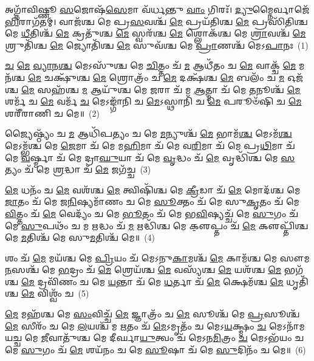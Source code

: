 \setcounter{anuvakam}{0}
𑌅𑌗𑍍𑌨𑌾᳴𑌵𑌿𑌷𑍍𑌣𑍂 \ul{𑌸}\-𑌜𑍋𑌷᳴\-\ul{𑌸𑍇}\-𑌮𑌾 𑌵᳴𑌰𑍍𑌧𑌨𑍍𑌤𑍁 \ul{𑌵𑌾𑌂} 𑌗𑌿𑌰𑌃᳴। \ul{𑌦𑍍𑌯𑍁}\-𑌮𑍍𑌨𑍈𑌰𑍍𑌵𑌾𑌜𑍇᳴\-\ul{𑌭𑌿}\-𑌰𑌾𑌗᳴𑌤𑌮𑍍। 𑌵𑌾𑌜᳴𑌶𑍍𑌚 𑌮𑍇 𑌪𑍍𑌰\-\ul{𑌸}\-𑌵𑌶𑍍𑌚᳴ \ul{𑌮𑍇} 𑌪𑍍𑌰𑌯᳴𑌤𑌿𑌶𑍍𑌚 \ul{𑌮𑍇} 𑌪𑍍𑌰𑌸𑌿᳴𑌤𑌿𑌶𑍍𑌚 𑌮𑍇 \ul{𑌧𑍀}\-𑌤𑌿𑌶𑍍𑌚᳴ \ul{𑌮𑍇} 𑌕𑍍𑌰𑌤𑍁᳴𑌶𑍍𑌚 \ul{𑌮𑍇} 𑌸𑍍𑌵𑌰᳴𑌶𑍍𑌚 \ul{𑌮𑍇} 𑌶𑍍𑌲𑍋𑌕᳴𑌶𑍍𑌚 𑌮𑍇 \ul{𑌶𑍍𑌰𑌾}\-𑌵𑌶𑍍𑌚᳴ \ul{𑌮𑍇} 𑌶𑍍𑌰𑍁𑌤𑌿᳴𑌶𑍍𑌚 \ul{𑌮𑍇} 𑌜𑍍𑌯𑍋𑌤𑌿᳴𑌶𑍍𑌚 \ul{𑌮𑍇} 𑌸𑍁𑌵᳴𑌶𑍍𑌚 𑌮𑍇 \ul{𑌪𑍍𑌰𑌾}\-𑌣𑌶𑍍𑌚᳴ 𑌮𑍇\-𑌽\-\ul{𑌪𑌾}\-𑌨𑌃~(1)

\-\ul{𑌚} \ul{𑌮𑍇} \ul{𑌵𑍍𑌯𑌾}\-𑌨\-\ul{𑌶𑍍𑌚} 𑌮𑍇\-𑌽𑌸𑍁᳴𑌶𑍍𑌚 𑌮𑍇 \ul{𑌚𑌿}\-𑌤𑍍𑌤𑌂 𑌚᳴ \ul{𑌮} 𑌆𑌧𑍀᳴𑌤𑌂 𑌚 \ul{𑌮𑍇} 𑌵𑌾𑌕𑍍𑌚᳴ \ul{𑌮𑍇} 𑌮𑌨᳴𑌶𑍍𑌚 \ul{𑌮𑍇} 𑌚𑌕𑍍𑌷𑍁᳴𑌶𑍍𑌚 \ul{𑌮𑍇} 𑌶𑍍𑌰𑍋𑌤𑍍𑌰𑌂᳴ 𑌚 \ul{𑌮𑍇} 𑌦𑌕𑍍𑌷᳴𑌶𑍍𑌚 \ul{𑌮𑍇} 𑌬𑌲𑌂᳴ 𑌚 \ul{𑌮} 𑌓𑌜᳴𑌶𑍍𑌚 \ul{𑌮𑍇} 𑌸𑌹᳴𑌶𑍍𑌚 \ul{𑌮} 𑌆𑌯𑍁᳴𑌶𑍍𑌚 𑌮𑍇 \ul{𑌜}\-𑌰𑌾 𑌚᳴ 𑌮 \ul{𑌆}\-𑌤𑍍𑌮𑌾 𑌚᳴ 𑌮𑍇 \ul{𑌤}\-𑌨𑍂𑌶𑍍𑌚᳴ \ul{𑌮𑍇} 𑌶𑌰𑍍𑌮᳴ 𑌚 \ul{𑌮𑍇} 𑌵𑌰𑍍𑌮᳴ \ul{𑌚} 𑌮𑍇\-𑌽𑌙𑍍𑌗𑌾᳴𑌨𑌿 𑌚 \ul{𑌮𑍇}\-\-𑌽𑌸𑍍𑌥𑌾𑌨𑌿᳴ 𑌚 \ul{𑌮𑍇} 𑌪𑌰𑍂𑍞᳴𑌷𑌿 𑌚 \ul{𑌮𑍇} 𑌶𑌰𑍀᳴𑌰𑌾𑌣𑌿 𑌚 𑌮𑍇॥~(2)

{\anuvakamend[{\-\ul{𑌅}\-\-\ul{𑌪𑌾}\-𑌨\-\ul{𑌸𑍍𑌤}\-𑌨𑍂𑌶𑍍𑌚᳴ \ul{𑌮𑍇}\-\-𑌽𑌷𑍍𑌟𑌾𑌦᳴𑌶 𑌚}]}%

𑌜𑍍𑌯𑍈𑌷𑍍𑌠𑍍𑌯𑌂᳴ 𑌚 \ul{𑌮} 𑌆𑌧𑌿᳴𑌪𑌤𑍍𑌯𑌂 𑌚 𑌮𑍇 \ul{𑌮}\-𑌨𑍍𑌯𑍁𑌶𑍍𑌚᳴ \ul{𑌮𑍇} 𑌭𑌾𑌮᳴\-\ul{𑌶𑍍𑌚} 𑌮𑍇\-𑌽𑌮᳴\-\ul{𑌶𑍍𑌚} 𑌮𑍇\-𑌽𑌮𑍍𑌭᳴𑌶𑍍𑌚 𑌮𑍇 \ul{𑌜𑍇}\-𑌮𑌾 𑌚᳴ 𑌮𑍇 𑌮\-\ul{𑌹𑌿}\-𑌮𑌾 𑌚᳴ 𑌮𑍇 𑌵\-\ul{𑌰𑌿}\-𑌮𑌾 𑌚᳴ 𑌮𑍇 𑌪𑍍𑌰\-\ul{𑌥𑌿}\-𑌮𑌾 𑌚᳴ 𑌮𑍇 \ul{𑌵}\-𑌰𑍍𑌷𑍍𑌮𑌾 𑌚᳴ 𑌮𑍇 𑌦𑍍𑌰𑌾\-\ul{𑌘𑍁}\-𑌯𑌾 𑌚᳴ 𑌮𑍇 \ul{𑌵𑍃}\-𑌦𑍍𑌧𑌂 𑌚᳴ \ul{𑌮𑍇} 𑌵𑍃𑌦𑍍𑌧𑌿᳴𑌶𑍍𑌚 𑌮𑍇 \ul{𑌸}\-𑌤𑍍𑌯𑌂 𑌚᳴ 𑌮𑍇 \ul{𑌶𑍍𑌰}\-𑌦𑍍𑌧𑌾 𑌚᳴ \ul{𑌮𑍇} 𑌜𑌗᳴𑌚𑍍𑌚~(3)

\-\ul{𑌮𑍇} 𑌧𑌨𑌂᳴ 𑌚 \ul{𑌮𑍇} 𑌵𑌶᳴𑌶𑍍𑌚 \ul{𑌮𑍇} 𑌤𑍍𑌵𑌿𑌷𑌿᳴𑌶𑍍𑌚 𑌮𑍇 \ul{𑌕𑍍𑌰𑍀}\-𑌡𑌾 𑌚᳴ \ul{𑌮𑍇} 𑌮𑍋𑌦᳴𑌶𑍍𑌚 𑌮𑍇 \ul{𑌜𑌾}\-𑌤𑌂 𑌚᳴ 𑌮𑍇 𑌜\-\ul{𑌨𑌿}\-𑌷𑍍𑌯𑌮𑌾᳴𑌣𑌂 𑌚 𑌮𑍇 \ul{𑌸𑍂}\-𑌕𑍍𑌤𑌂 𑌚᳴ 𑌮𑍇 𑌸𑍁\-\ul{𑌕𑍃}\-𑌤𑌂 𑌚᳴ 𑌮𑍇 \ul{𑌵𑌿}\-𑌤𑍍𑌤𑌂 𑌚᳴ \ul{𑌮𑍇} 𑌵𑍇𑌦𑍍𑌯𑌂᳴ 𑌚 𑌮𑍇 \ul{𑌭𑍂}\-𑌤𑌂 𑌚᳴ 𑌮𑍇 𑌭\-\ul{𑌵𑌿}\-𑌷𑍍𑌯𑌚𑍍𑌚᳴ 𑌮𑍇 \ul{𑌸𑍁}\-𑌗𑌂 𑌚᳴ 𑌮𑍇 \ul{𑌸𑍁}\-𑌪𑌥𑌂᳴ 𑌚 𑌮 \ul{𑌋}\-𑌦𑍍𑌧𑌂 𑌚᳴ \ul{𑌮} 𑌋𑌦𑍍𑌧𑌿᳴𑌶𑍍𑌚 𑌮𑍇 𑌕𑍢॒𑌪𑍍𑌤𑌂 𑌚᳴ \ul{𑌮𑍇} 𑌕𑍢𑌪𑍍𑌤𑌿᳴𑌶𑍍𑌚 𑌮𑍇 \ul{𑌮}\-𑌤𑌿𑌶𑍍𑌚᳴ 𑌮𑍇 𑌸𑍁\-\ul{𑌮}\-𑌤𑌿𑌶𑍍𑌚᳴ 𑌮𑍇॥~(4)

{\anuvakamend[{𑌜\-\ul{𑌗}\-𑌚𑍍𑌚\-\ul{𑌰𑍍𑌦𑍍𑌧𑌿}\-𑌶𑍍𑌚𑌤𑍁᳴𑌰𑍍𑌦𑌶 𑌚}]}%

𑌶𑌂 𑌚᳴ \ul{𑌮𑍇} 𑌮𑌯᳴𑌶𑍍𑌚 𑌮𑍇 \ul{𑌪𑍍𑌰𑌿}\-𑌯𑌂 𑌚᳴ 𑌮𑍇\-𑌽𑌨𑍁\-\ul{𑌕𑌾}\-𑌮𑌶𑍍𑌚᳴ \ul{𑌮𑍇} 𑌕𑌾𑌮᳴𑌶𑍍𑌚 𑌮𑍇 𑌸𑍗𑌮\-\ul{𑌨}\-𑌸𑌶𑍍𑌚᳴ 𑌮𑍇 \ul{𑌭}\-𑌦𑍍𑌰𑌂 𑌚᳴ \ul{𑌮𑍇} 𑌶𑍍𑌰𑍇𑌯᳴𑌶𑍍𑌚 \ul{𑌮𑍇} 𑌵𑌸𑍍𑌯᳴𑌶𑍍𑌚 \ul{𑌮𑍇} 𑌯𑌶᳴𑌶𑍍𑌚 \ul{𑌮𑍇} 𑌭𑌗᳴𑌶𑍍𑌚 \ul{𑌮𑍇} 𑌦𑍍𑌰𑌵𑌿᳴𑌣𑌂 𑌚 𑌮𑍇 \ul{𑌯}\-𑌨𑍍𑌤𑌾 𑌚᳴ 𑌮𑍇 \ul{𑌧}\-𑌰𑍍𑌤𑌾 𑌚᳴ \ul{𑌮𑍇} 𑌕𑍍𑌷𑍇𑌮᳴𑌶𑍍𑌚 \ul{𑌮𑍇} 𑌧𑍃𑌤𑌿᳴𑌶𑍍𑌚 \ul{𑌮𑍇} 𑌵𑌿𑌶𑍍𑌵𑌂᳴ 𑌚~(5)

\-\ul{𑌮𑍇} 𑌮𑌹᳴𑌶𑍍𑌚 𑌮𑍇 \ul{𑌸𑌂}\-𑌵𑌿𑌚𑍍𑌚᳴ \ul{𑌮𑍇} 𑌜𑍍𑌞𑌾𑌤𑍍𑌰𑌂᳴ 𑌚 \ul{𑌮𑍇} 𑌸𑍂𑌶𑍍𑌚᳴ 𑌮𑍇 \ul{𑌪𑍍𑌰}\-𑌸𑍂𑌶𑍍𑌚᳴ \ul{𑌮𑍇} 𑌸𑍀𑌰𑌂᳴ 𑌚 𑌮𑍇 \ul{𑌲}\-𑌯𑌶𑍍𑌚᳴ 𑌮 \ul{𑌋}\-𑌤𑌂 𑌚᳴ \ul{𑌮𑍇}\-\-𑌽𑌮𑍃𑌤𑌂᳴ 𑌚 𑌮𑍇\-𑌽\-\ul{𑌯}\-𑌕𑍍𑌷𑍍𑌮𑌂 \ul{𑌚} 𑌮𑍇\-𑌽𑌨𑌾᳴𑌮𑌯𑌚𑍍𑌚 𑌮𑍇 \ul{𑌜𑍀}\-𑌵𑌾𑌤𑍁᳴𑌶𑍍𑌚 𑌮𑍇 𑌦𑍀𑌰𑍍𑌘𑌾\-\ul{𑌯𑍁}\-𑌤𑍍𑌵𑌂 𑌚᳴ 𑌮𑍇\-𑌽𑌨\-\ul{𑌮𑌿}\-𑌤𑍍𑌰𑌂 \ul{𑌚} 𑌮𑍇\-𑌽𑌭᳴𑌯𑌂 𑌚 𑌮𑍇 \ul{𑌸𑍁}\-𑌗𑌂 𑌚᳴ \ul{𑌮𑍇} 𑌶𑌯᳴𑌨𑌂 𑌚 𑌮𑍇 \ul{𑌸𑍂}\-𑌷𑌾 𑌚᳴ 𑌮𑍇 \ul{𑌸𑍁}\-𑌦𑌿𑌨𑌂᳴ 𑌚 𑌮𑍇॥~(6)


